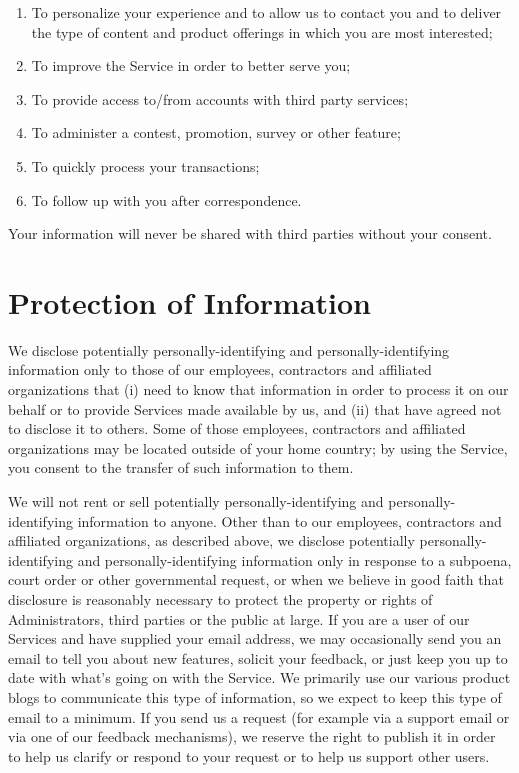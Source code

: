 \documentclass[11pt]{article}
\begin{document}
\begin{enumerate}
\item{To personalize your experience and to allow us to contact you and to deliver
the type of content and product offerings in which you are most interested;} 
\item{To improve the Service in order to better serve you;} 
\item{To provide access to/from accounts with third party services;}
\item{To administer a contest, promotion, survey or other feature;} 
\item{To quickly process your transactions;}
\item{To follow up with you after correspondence.}
\end{enumerate}

Your information will never be shared with third parties without your consent.

\section{Protection of Information}

We disclose potentially personally-identifying and personally-identifying information
only to those of our employees, contractors and affiliated organizations that (i) need
to know that information in order to process it on our behalf or to provide Services made
available by us, and (ii) that have agreed not to disclose it to others. Some of those
employees, contractors and affiliated organizations may be located outside of your
home country; by using the Service, you consent to the transfer of such information
to them.

We will not rent or sell potentially personally-identifying and personally-identifying
information to anyone. Other than to our employees, contractors and affiliated
organizations, as described above, we disclose potentially personally-identifying and
personally-identifying information only in response to a subpoena, court order or
other governmental request, or when we believe in good faith that disclosure is
reasonably necessary to protect the property or rights of Administrators, third parties 
or the public at large. If you are a user of our Services and have supplied
your email address, we may occasionally send you an email to tell you about new
features, solicit your feedback, or just keep you up to date with what’s going on
with the Service. We primarily use our various product blogs to communicate this type
of information, so we expect to keep this type of email to a minimum. If you send us
a request (for example via a support email or via one of our feedback mechanisms),
we reserve the right to publish it in order to help us clarify or respond to your
request or to help us support other users.
\end{document}
